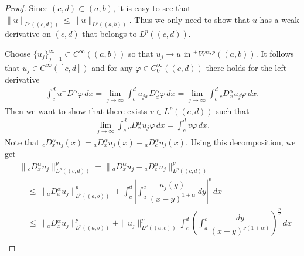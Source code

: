 \documentclass[leqno,final]{siamltex}
\numberwithin{equation}{section}
\renewcommand{\(}{\bigl(}
\renewcommand{\)}{\bigr)}
\begin{document}
    \begin{proof}
         Since $(c,d) \subset (a,b)$, it is easy to see that $\|u \|_{L^{p}((c,d))} \leq \|u \|_{L^{p}((a,b))}$. Thus we only need to show that $u$ has a weak derivative on $(c,d)$ that belongs to $L^{p}((c,d))$. 
         
         Choose $\{u_j\}_{j=1}^{\infty} \subset C^{\infty}((a,b))$ so that $u_j \rightarrow u$ in ${^{\pm}}{W}{^{\alpha,p}}((a,b))$. It follows that $u_j \in C^{\infty}([c,d])$ and for any $\varphi \in C^{\infty}_{0}((c,d))$ there holds for the left derivative
        \begin{align*}
            \int_{c}^{d} u {^{+}}{D}{^{\alpha}} \varphi\, dx = \lim_{ j \rightarrow \infty} \int_{c}^{d} u_j {_{x}}{D}{^{\alpha}_{d}}\varphi\, dx 
            = \lim_{j \rightarrow \infty} \int_{c}^{d} {_{c}}{D}{^{\alpha}_{x}} u_j \varphi\, dx.
        \end{align*}
        Then we want to show that there exists $v \in L^{p}((c,d))$ such that 
        \begin{align*}
            \lim_{j \rightarrow \infty} \int_{c}^{d} {_{c}}{D}{^{\alpha}_{x}} u_j \varphi\, dx = \int_{c}^{d} v \varphi\, dx. 
        \end{align*}
        Note that 
            $ {_{c}}{D}{^{\alpha}_{x}}u_j(x) = {_{a}}{D}{^{\alpha}_{x}} u_j(x) - {_{a}}{D}{^{\alpha}_{c}} u_j(x).$
        Using this decomposition, we get
        \begin{align*}
            &\|{_{c}}{D}{^{\alpha}_{x}}u_j \|_{L^{p}((c,d))}^{p} = \| {_{a}}{D}{^{\alpha}_{x}} u_j - {_{a}}{D}{^{\alpha}_{c}} u_j\|_{L^{p}((c,d))}^{p} \\
            &\quad\leq \| {_{a}}{D}{^{\alpha}_{x}} u_j\|_{L^{p}((a,b))}^{p} + \int_{c}^{d} \left|\int_{a}^{c} \dfrac{u_j(y)}{(x-y)^{1+\alpha}}\,dy \right|^{p}\,dx \\ 
            &\quad\leq \| {_{a}}{D}{^{\alpha}_{x}} u_j\|_{L^{p}((a,b))}^{p}+  \|u_j\|_{L^{\mu}((a,c))}^{p} \int_{c}^{d} \left(\int_{a}^{c} \dfrac{dy}{(x-y)^{\nu (1+\alpha)}}\right)^{\frac{p}{\nu}} \,dx \\ 

\end{align*}
\end{proof}
\end{document}
